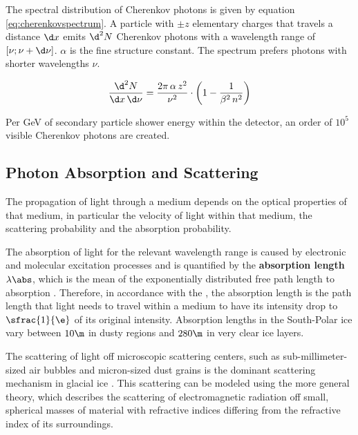 The spectral distribution of Cherenkov photons is given by equation \ref{eq:cherenkovspectrum}. A particle with $\pm z$ elementary charges that travels a distance $\d x$ emits $\d^2 N$ Cherenkov photons with a wavelength range of $[\nu; \nu + \d\nu]$. $\alpha$ is the fine structure constant. \cite{katz2012}
The spectrum prefers photons with shorter wavelengths $\nu$.

\begin{equation}
  \frac{\d^2 N}{\d x\,\d\nu} = \frac{2\pi\,\alpha\,z^2}{\nu^2}\cdot
  \left( 1 - \frac{1}{\beta^2\,n^2} \right)
  \label{eq:cherenkovspectrum}
\end{equation}

Per GeV of secondary particle shower energy within the detector, an order of $10^5$\nbsp visible Cherenkov photons are created. \cite{instrumentation}




\subsection{Photon Absorption and Scattering}
\label{sec:scattering}

The propagation of light through a medium depends on the optical properties of that medium, in particular the velocity of light within that medium, the scattering probability and the absorption probability. \cite{lundberg}

The absorption of light for the relevant wavelength range is caused by electronic and molecular excitation processes \cite{lundberg}
and is quantified by the \textbf{absorption length} $\lambda\abs$, which is the mean of the exponentially distributed free path length to absorption \cite{lundberg}.
Therefore, in accordance with the , the absorption length is the path length that light needs to travel within a medium to have its intensity drop to $\sfrac{1}{\e}$ of its original intensity. \cite{lexikonderphysik}
Absorption lengths in the South-Polar ice vary between $10\m$ in dusty regions and $280\m$ in very clear ice layers. \cite{ackermann, ppcpaper, icepaper}

The scattering of light off microscopic scattering centers, such as sub-millimeter-sized air bubbles and micron-sized dust grains \cite{Price1997, ackermann} is the dominant scattering mechanism in glacial ice \cite{Askebjer1997, lundberg}. This scattering can be modeled using the more general  theory, which describes the scattering of electromagnetic radiation off small, spherical masses of material with refractive indices differing from the refractive index of its surroundings. \cite{Mie1908, ackermann, lundberg}

